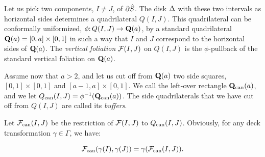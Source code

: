 Let us pick  two components, $I\not= J$, of $\partial \hat S$.
The disk $\Delta$ with these two intervals as horizontal sides determines a quadrilateral $Q(I, J)$.
This quadrilateral can be conformally uniformized, $\phi\mathpunct:  Q(I, J)\rightarrow {\bf Q} (a) $,
by a standard quadrilateral ${\bf Q}(a) = [0,a]\times [0,1]$
in such a way that $I$ and $J$ correspond to the horizontal sides of ${\bf Q}(a)$.
The {\it vertical foliation} $ {\mathcal F}(I, J)$ on $Q(I, J)$
is the $\phi$-pullback of the standard vertical foliation  on ${\bf Q}(a)$.

Assume now that $a>2$, and let us cut off from ${\bf Q}(a) $ two side squares, $[0,1]\times [0,1]$
and $[a-1, a]\times [0,1]$.  We call the left-over rectangle ${\bf Q}_{\mathrm{can}}(a)$,
and we let $Q_{\mathrm{can}}( I,  J) = \phi^{-1}({\bf Q}_{\mathrm{can}}(a))$.
The side quadrilaterals that we have cut off from $Q(I,J)$ are called its {\it buffers}.

Let ${\mathcal F}_{\mathrm{can}}(I, J)$ be the restriction of $ {\mathcal F}(I, J)$ to $Q_{\mathrm{can}}(I, J)$.
Obviously, for any deck transformation $\gamma \in \Gamma$, we have:

\begin{equation}\label{phi}
        {\mathcal F}_{\mathrm{can}} ({\gamma (I), \gamma (J)}) = \gamma({\mathcal F}_{\mathrm{can}} (I, J)).
\end{equation}


